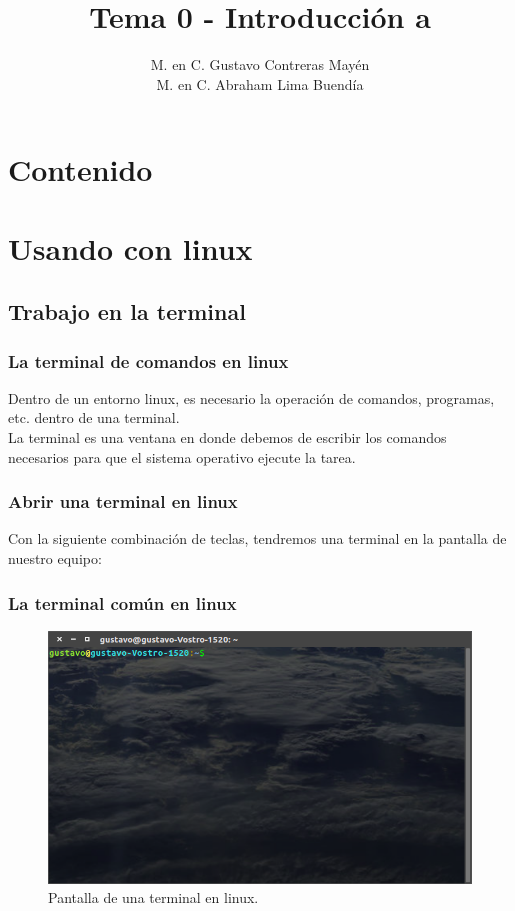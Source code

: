 \documentclass[12pt]{beamer}
\title{Tema 0 - Introducción a \python}
\author[]{M. en C. Gustavo Contreras Mayén \\ M. en C. Abraham Lima Buendía}
\begin{document}
\maketitle

\section*{Contenido}


\section{Usando \python{} con linux}
\subsection{Trabajo en la terminal}
\begin{frame}
\frametitle{La terminal de comandos en linux}
Dentro de un entorno linux, es necesario la operación de comandos, programas, etc. dentro de una terminal.
\\
\bigskip
La terminal es una ventana en donde debemos de escribir los comandos necesarios para que el sistema operativo ejecute la tarea.
\end{frame}
\begin{frame}
\frametitle{Abrir una terminal en linux}
Con la siguiente combinación de teclas, tendremos una terminal en la pantalla de nuestro equipo:
\\
\bigskip
\bigskip
\begin{center}
\end{center}
\end{frame}
\begin{frame}
\frametitle{La terminal común en linux}
\begin{figure}
	\centering
	\includegraphics[scale=0.4]{Figuras/Terminal_01.png}
	\caption{Pantalla de una terminal en linux.}
\end{figure}
\end{frame}
\end{document}
